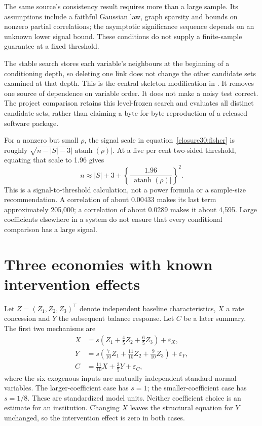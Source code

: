 The same source's consistency result requires more than a large sample. Its
assumptions include a faithful Gaussian law, graph sparsity and bounds on
nonzero partial correlations; the asymptotic significance sequence depends on
an unknown lower signal bound. These conditions do not supply a finite-sample
guarantee at a fixed threshold. \citep[Assumptions A1--A4 and Theorem 1,
pp.~619--620]{closure30kalisch}

The stable search stores each variable's neighbours at the beginning of a
conditioning depth, so deleting one link does not change the other candidate
sets examined at that depth. This is the central skeleton modification in
\citet[Section 4.1, Algorithm 4.1 and Theorem 3]{closure30colombo}. It removes
one source of dependence on variable order. It does not make a noisy test
correct. The project comparison retains this level-frozen search and evaluates
all distinct candidate sets, rather than claiming a byte-for-byte reproduction
of a released software package.

For a nonzero but small $\rho$, the signal scale in
equation~\ref{closure30:fisher} is roughly
$\sqrt{n-|S|-3}|\operatorname{atanh}(\rho)|$. At a five per cent two-sided
threshold, equating that scale to 1.96 gives
\begin{equation}
 n\approx |S|+3+
 \left\{\frac{1.96}{|\operatorname{atanh}(\rho)|}\right\}^{2}.
 \label{closure30:signal-scale}
\end{equation}
This is a signal-to-threshold calculation, not a power formula or a sample-size
recommendation. A correlation of about 0.00433 makes its last term approximately
205,000; a correlation of about 0.0289 makes it about 4,595. Large coefficients
elsewhere in a system do not ensure that every conditional comparison has a
large signal.

\section{Three economies with known intervention effects}

Let $Z=(Z_1,Z_2,Z_3)^\top$ denote independent baseline characteristics,
$X$ a rate concession and $Y$ the subsequent balance response. Let $C$ be a
later summary. The first two mechanisms are
\begin{align}
 X&=s\left(Z_1+\frac45Z_2+\frac65Z_3\right)+\varepsilon_X,\\
 Y&=s\left(\frac7{10}Z_1+\frac{11}{10}Z_2+
                 \frac9{10}Z_3\right)+\varepsilon_Y,\\
 C&=\frac{11}{10}X+\frac35Y+\varepsilon_C,
 \label{closure30:sampling-economy}
\end{align}
where the six exogenous inputs are mutually independent standard normal
variables. The larger-coefficient case has $s=1$; the smaller-coefficient case
has $s=1/8$. These are standardized model units. Neither coefficient choice is
an estimate for an institution. Changing $X$ leaves the structural equation
for $Y$ unchanged, so the intervention effect is zero in both cases.

